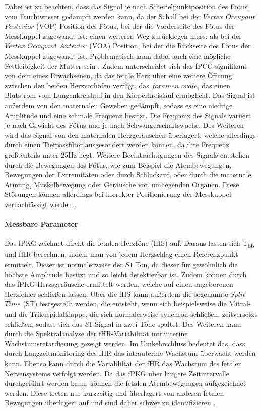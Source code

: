 \documentclass[10pt,a4paper,headinclude,twoside, plainheadsepline, open=right, numbers=noenddot, twocolumn]{article}
\begin{document}
Dabei ist zu beachten, dass das Signal je nach Scheitelpunktposition des Fötus vom Fruchtwasser gedämpft werden kann, da der Schall bei der $Vertex$ $Occupant$ $Posterior$ (VOP) Position des Fötus, bei der die Vorderseite des Fötus der Messkuppel zugewandt ist, einen weiteren Weg zurücklegen muss, als bei der $Vertex$ $Occupant$ $Anterior$ (VOA) Position, bei der die Rückseite des Fötus der Messkuppel zugewandt ist.
Problematisch kann dabei auch eine mögliche Fettleibigkeit der Mutter sein \cite{adithya2017trends}.
Zudem unterscheidet sich das fPCG signifikant von dem eines Erwachsenen, da das fetale Herz über eine weitere Öffnung zwischen den beiden Herzvorhöfen verfügt, das $foramen$ $ovale$, das einen Blutstrom vom Lungenkreislauf in den Körperkreislauf ermöglicht.
Das Signal ist außerdem von den maternalen Geweben gedämpft, sodass es eine niedrige Amplitude und eine schmale Frequenz besitzt.
Die Frequenz des Signals variiert je nach Gewicht des Fötus und je nach Schwangerschaftswoche.
Des Weiteren wird das Signal von den maternalen Herzgeräuschen überlagert, welche allerdings durch einen Tiefpassfilter ausgesondert werden können, da ihre Frequenz größtenteils unter 25Hz liegt.
Weitere Beeinträchtigungen des Signals entstehen durch die Bewegungen des Fötus, wie zum Beispiel die Atembewegungen, Bewegungen der Extremitäten oder durch Schluckauf, oder durch die maternale Atmung, Muskelbewegung oder Geräusche von umliegenden Organen.
Diese Störungen können allerdings bei korrekter Positionierung der Messkuppel vernachlässigt werden \cite{kovacs2011fetal}.

\paragraph{Messbare Parameter}

Das fPKG zeichnet direkt die fetalen Herztöne (fHS) auf.
Daraus lassen sich T\textsubscript{bb} und fHR berechnen, indem man von jedem Herzschlag einen Referenzpunkt ermittelt.
Dieser ist normalerweise der $S1$ Ton, da dieser für gewöhnlich die höchste Amplitude besitzt und so leicht detektierbar ist.
Zudem können durch das fPKG Herzsgeräusche ermittelt werden, welche auf einen angeborenen Herzfehler schließen lassen.
Über die fHS kann außerdem die sogenannte $Split$ $Time$ (ST) festgestellt werden, die entsteht, wenn sich beispielsweise die Mitral- und die Trikuspidalklappe, die sich normalerweise synchron schließen, zeitversetzt schließen, sodass sich das $S1$ Signal in zwei Töne spaltet.
Des Weiteren kann durch die Spektralanalyse der fHR-Variabilität intrauterine Wachstumsretardierung gezeigt werden.
Im Umkehrschluss bedeutet das, dass durch Langzeitmonitoring des fHR das intrauterine Wachstum überwacht werden kann.
Ebenso kann durch die Variabliltät der fHR das Wachstum des fetalen Nervensystems verfolgt werden.
Da das fPKG über längere Zeitintervalle durchgeführt werden kann, können die fetalen Atembewegungen aufgezeichnet werden.
Diese treten nur kurzzeitig und überlagert von anderen fetalen Bewegungen überlagert auf und sind daher schwer zu identifizieren  \cite{kovacs2011fetal}.
\end{document}
